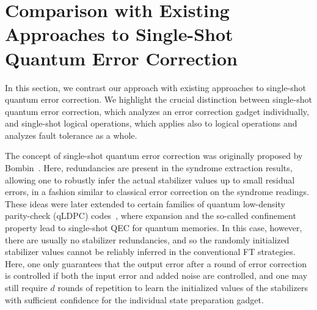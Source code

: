 \section{Comparison with Existing Approaches to Single-Shot Quantum Error Correction}

In this section, we contrast our approach with existing approaches to single-shot quantum error correction.
%
We highlight the crucial distinction between single-shot quantum error correction, which analyzes an error correction gadget individually, and single-shot logical operations, which applies also to logical operations and analyzes fault tolerance as a whole.

The concept of single-shot quantum error correction was originally proposed by Bombin~\cite{bombin2015single}.
%
Here, redundancies are present in the syndrome extraction results, allowing one to robustly infer the actual stabilizer values up to small residual errors, in a fashion similar to classical error correction on the syndrome readings.
%
These ideas were later extended to certain families of quantum low-density parity-check (qLDPC) codes~\cite{quintavalle2020single,campbell2019theory,fawzi2018constant,gu2024single}, where expansion and the so-called confinement property lead to single-shot QEC for quantum memories.
%
In this case, however, there are usually no stabilizer redundancies, and so the randomly initialized stabilizer values cannot be reliably inferred in the conventional FT strategies.
%
Here, one only guarantees that the output error after a round of error correction is controlled if both the input error and added noise are controlled, and one may still require $d$ rounds of repetition to learn the initialized values of the stabilizers with sufficient confidence for the individual state preparation gadget.

